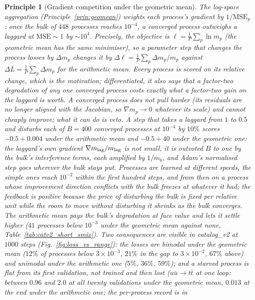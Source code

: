 \documentclass[11pt]{article}
\newtheorem{principle}{Principle}
\begin{document}
\begin{principle}[Gradient competition under the geometric mean]\label{prin:gradcomp}
The log-space aggregation (Principle~\ref{prin:geomean}) weights each process's gradient by
$1/\mathrm{MSE}_p$: once the bulk of $448$ processes reaches $10^{-4}$, a converged process
outweighs a laggard at $\mathrm{MSE}\sim1$ by $\sim\!10^4$. Precisely, the objective is
$\ell=\frac1P\sum_p\ln m_p$ (the geometric mean has the same minimiser), so a parameter step
that changes the process losses by $\Delta m_p$ changes it by
$\Delta\ell=\frac1P\sum_p\Delta m_p/m_p$ against $\Delta L=\frac1P\sum_p\Delta m_p$ for the
arithmetic mean. Every process is scored on its relative change, which is the motivation;
differentiated, it also says that a factor-two degradation of any one converged process
costs exactly what a factor-two gain on the laggard is worth. A converged process does not
pull harder (its residuals are no longer aligned with the Jacobian, so $\nabla m_p\to0$
whatever its scale) and cannot cheaply improve; what it can do is veto. A step that takes a
laggard from $1$ to $0.5$ and disturbs each of $B=400$ converged processes at $10^{-4}$ by
$10\%$ scores $-0.5+0.004$ under the arithmetic mean and $-0.5+40$ under the geometric one:
the laggard's own gradient $\nabla m_{\rm lag}/m_{\rm lag}$ is not small, it is outvoted
$B$ to one by the bulk's interference terms, each amplified by $1/m_b$, and Adam's
normalised step goes wherever the bulk stays put. Processes are learned at different
speeds, the simple ones reach $10^{-2}$ within the first hundred steps, and from then on
a process whose improvement direction conflicts with the bulk freezes at whatever it had;
the feedback is positive because the price of disturbing the bulk is fixed per relative
unit while the room to move without disturbing it shrinks as the bulk converges. The
arithmetic mean pays the bulk's degradation at face value and lets it settle higher
($41$ processes below $10^{-3}$ under the geometric mean against none,
Table~\ref{tab:catv2_short_smix}). Two consequences are visible in catalog\_v2 at $1000$
steps (Fig.~\ref{fig:loss_vs_range}): the losses are bimodal under the geometric mean
($12\%$ of processes below $3\times10^{-3}$, $21\%$ in the gap to $3\times10^{-2}$, $67\%$
above) and unimodal under the arithmetic one ($5\%$, $36\%$, $59\%$); and a starved process
is flat from its first validation, not trained and then lost ($u\bar u\to t\bar t$ at one
loop: between $0.96$ and $2.0$ at all twenty validations under the geometric mean, $0.013$
at the end under the arithmetic one; the per-process record is in

\end{principle}
\end{document}
